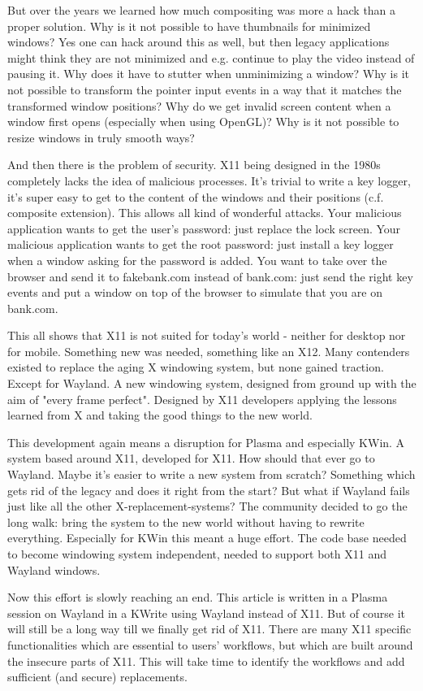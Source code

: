 But over the years we learned how much compositing was more a hack than a proper solution. Why is it not possible to have thumbnails for minimized windows? Yes one can hack around this as well, but then legacy applications might think they are not minimized and e.g. continue to play the video instead of pausing it. Why does it have to stutter when unminimizing a window? Why is it not possible to transform the pointer input events in a way that it matches the transformed window positions? Why do we get invalid screen content when a window first opens (especially when using OpenGL)? Why is it not possible to resize windows in truly smooth ways?

And then there is the problem of security. X11 being designed in the 1980s completely lacks the idea of malicious processes. It's trivial to write a key logger, it's super easy to get to the content of the windows and their positions (c.f. composite extension). This allows all kind of wonderful attacks. Your malicious application wants to get  the user's password: just replace the lock screen. Your malicious application wants to get the root password: just install a key logger when a window asking for the password is added. You want to take over the browser and send it to fakebank.com instead of bank.com: just send the right key events and put a window on top of the browser to simulate that you are on bank.com.

This all shows that X11 is not suited for today's world - neither for desktop nor for mobile. Something new was needed, something like an X12. Many contenders existed to replace the aging X windowing system, but none gained traction. Except for Wayland. A new windowing system, designed from ground up with the aim of "every frame perfect". Designed by X11 developers applying the lessons learned from X and taking the good things to the new world.

This development again means a disruption for Plasma and especially KWin. A system based around X11, developed for X11. How should that ever go to Wayland. Maybe it's easier to write a new system from scratch? Something which gets rid of the legacy and does it right from the start? But what if Wayland fails just like all the other X-replacement-systems? The community decided to go the long walk: bring the system to the new world without having to rewrite everything. Especially for KWin this meant a huge effort. The code base needed to become windowing system independent, needed to support both X11 and Wayland windows.

Now this effort is slowly reaching an end. This article is written in a Plasma session on Wayland in a KWrite using Wayland instead of X11. But of course it will still be a long way till we finally get rid of X11. There are many X11 specific functionalities which are essential to users' workflows, but which are built around the insecure parts of X11. This will take time to identify the workflows and add sufficient (and secure) replacements.
